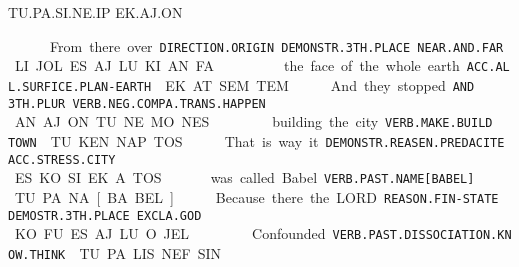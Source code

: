 {TU.PA.SI.NE.IP				EK.AJ.ON 

\tu\pa\si\Atlanne\ip~\ek\aj\on
\drie

 

From 			there 			over 		

{\tt DIRECTION.ORIGIN         DEMONSTR.3TH.PLACE  NEAR.AND.FAR }

LI.JOL			ES.AJ.LU		KI.AN.FA	 

\li\jol~\es\aj\lu~\ki\an\fa
\drie
 

 

the face of the whole earth 

{\tt ACC.ALL.SURFICE.PLAN-EARTH }

EK.AT.SEM.TEM 

\ek\at\sem\tem
\drie

 

And 	they 		stopped 				 

{\tt AND	3TH.PLUR	VERB.NEG.COMPA.TRANS.HAPPEN	 }

AN	AJ.ON		TU.NE.MO.NES		                               

\an~\aj\on~\tu\Atlanne\mo\nes
\drie
 

building 		the city 

{\tt VERB.MAKE.BUILD	TOWN }

TU.KEN.NAP                      TOS 

\tu\ken\nap~\tos
\drie

 

That is way 				it 			

{\tt DEMONSTR.REASEN.PREDACITE	ACC.STRESS.CITY	 }

ES.KO.SI				EK.A.TOS		 

\es\ko\si~\ek\Atlana\tos 
\drie
 

was called Babel 

{\tt VERB.PAST.NAME[BABEL] }

TU.PA.NA[BA.BEL] 

\tu\pa\na\cartouche{\pa\pel}
\drie

  

Because 		there 				the LORD  

{\tt REASON.FIN-STATE          DEMOSTR.3TH.PLACE		EXCLA.GOD }

KO.FU			ES.AJ.LU			O.JEL 

\ko\fu~\es\aj\lu~\Atlano\jel
\drie

Confounded 

{\tt VERB.PAST.DISSOCIATION.KNOW.THINK	 }

TU.PA.LIS.NEF.SIN                                               			 

}
